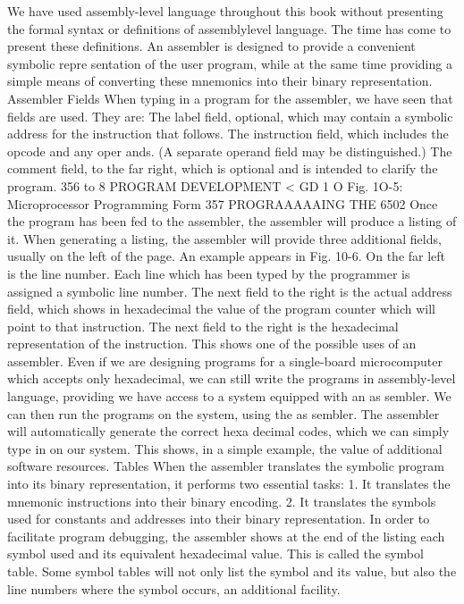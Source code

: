 {{{{{{{{{{{{{{{{{{{{{{{{{{{{{{{{{{{{{{{{{{{{{{{{{{{{{{{{{{{{{{{{{{{{{{{{{{{{{{{{{{{{{{{{{{{{{{{{{{{{{{{{{{{{{{{{{{{{{{{{{{{{{{{{{{{{{{{{{{{{We have used assembly-level language throughout this book
without presenting the formal syntax or definitions of assemblylevel
language. The time has come to present these definitions.
An assembler is designed to provide a convenient symbolic repre
sentation of the user program, while at the same time providing a
simple means of converting these mnemonics into their binary
representation.
Assembler Fields
When typing in a program for the assembler, we have seen that
fields are used. They are:
The label field, optional, which may contain a symbolic address
for the instruction that follows.
The instruction field, which includes the opcode and any oper
ands. (A separate operand field may be distinguished.)
The comment field, to the far right, which is optional and is
intended to clarify the program.
356
to
8
PROGRAM DEVELOPMENT
<
GD
1
O
Fig. 1O-5: Microprocessor Programming Form
357
PROGRAAAAAING THE 6502
Once the program has been fed to the assembler, the assembler will
produce a listing of it. When generating a listing, the assembler will
provide three additional fields, usually on the left of the page. An
example appears in Fig. 10-6. On the far left is the line number. Each
line which has been typed by the programmer is assigned a symbolic
line number.
The next field to the right is the actual address field, which shows
in hexadecimal the value of the program counter which will point to
that instruction.
The next field to the right is the hexadecimal representation of the
instruction.
This shows one of the possible uses of an assembler. Even if we are
designing programs for a single-board microcomputer which accepts
only hexadecimal, we can still write the programs in assembly-level
language, providing we have access to a system equipped with an as
sembler. We can then run the programs on the system, using the as
sembler. The assembler will automatically generate the correct hexa
decimal codes, which we can simply type in on our system. This
shows, in a simple example, the value of additional software resources.
Tables
When the assembler translates the symbolic program into its binary
representation, it performs two essential tasks:
1. It translates the mnemonic instructions into their binary encoding.
2. It translates the symbols used for constants and addresses into
their binary representation.
In order to facilitate program debugging, the assembler shows at
the end of the listing each symbol used and its equivalent hexadecimal
value. This is called the symbol table.
Some symbol tables will not only list the symbol and its value, but
also the line numbers where the symbol occurs, an additional facility.
}}}}}}}}}}}}}}}}}}}}}}}}}}}}}}}}}}}}}}}}}}}}}}}}}}}}}}}}}}}}}}}}}}}}}}}}}}}}}}}}}}}}}}}}}}}}}}}}}}}}}}}}}}}}}}}}}}}}}}}}}}}}}}}}}}}}}}}}}}}}
